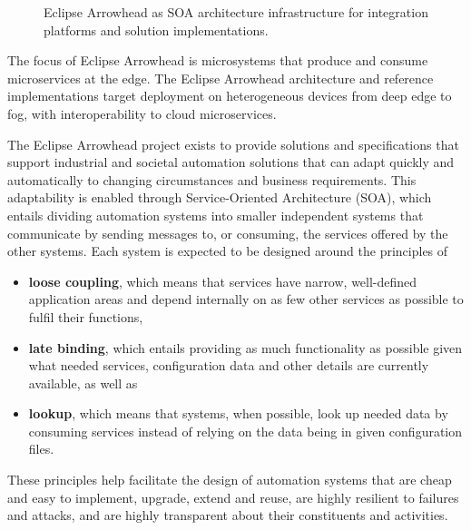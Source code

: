 \documentclass[a4paper]{arrowhead}
\begin{document}
\begin{figure}[h!]
\centering
{}
\caption{Eclipse Arrowhead as SOA architecture infrastructure for integration platforms and
solution implementations.}
\label{fig:concept}
\end{figure}

The focus of Eclipse Arrowhead is microsystems that produce and consume microservices at the
edge. The Eclipse Arrowhead architecture and reference implementations target deployment on
heterogeneous devices from deep edge to fog, with interoperability to cloud microservices.

The Eclipse Arrowhead project exists to provide solutions and specifications that support
industrial and societal automation solutions that can adapt quickly and automatically to
changing circumstances and business requirements. This adaptability is enabled through
Service-Oriented Architecture (SOA), which entails dividing automation systems into smaller
independent systems that communicate by sending messages to, or consuming, the services
offered by the other systems. Each system is expected to be designed around the principles of
\begin{itemize}
  \item \textbf{loose coupling}, which means that services have narrow, well-defined application
        areas and depend internally on as few other services as possible to fulfil their
        functions,
  \item \textbf{late binding}, which entails providing as much functionality as possible given
        what needed services, configuration data and other details are currently available, as
        well as
  \item \textbf{lookup}, which means that systems, when possible, look up needed data by
        consuming services instead of relying on the data being in given configuration files.
\end{itemize}
These principles help facilitate the design of automation systems that are cheap and easy to
implement, upgrade, extend and reuse, are highly resilient to failures and attacks, and are
highly transparent about their constituents and activities.
\end{document}
